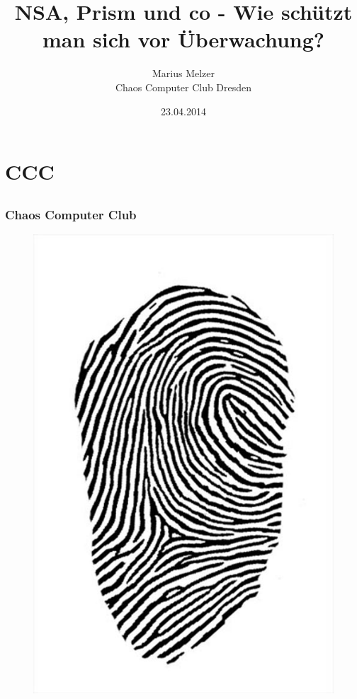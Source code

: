 \documentclass[12pt]{beamer}
\title{NSA, Prism und co - Wie schützt man sich vor Überwachung?}
\author{\small Marius Melzer\\\large Chaos Computer Club Dresden}
\date{23.04.2014}
\begin{document}
\maketitle

\section{CCC}
\subsection{}

\begin{frame}
  \frametitle{Chaos Computer Club}
  \begin{figure}
    \includegraphics[height=0.7\textheight]{img/fingerabdruck.jpg}
  \end{figure}
\end{frame}
\end{document}

